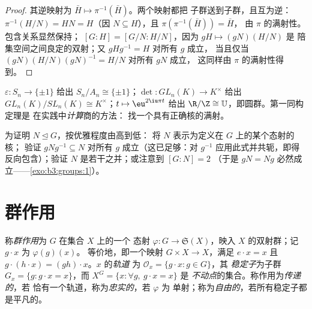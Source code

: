 \begin{proof}
其逆映射为 $\bar H \mapsto \pi^{-1}(\bar H)$。两个映射都把
子群送到子群，且互为逆：$\pi^{-1}(H/N) =
HN = H$（因 $N \subseteq H$），且 $\pi(\pi^{-1}(\bar H)) = \bar H$，
由 $\pi$ 的满射性。包含关系显然保持；
$[G:H] = [G/N : H/N]$，因为 $gH \mapsto (gN)(H/N)$ 是
陪集空间之间良定的双射；又 $gHg^{-1} = H$ 对所有 $g$ 成立，
当且仅当 $(gN)(H/N)(gN)^{-1} = H/N$ 对所有 $gN$ 成立，
这同样由 $\pi$ 的满射性得到。
\end{proof}

\begin{example}\label{ex:b3:groups:firstiso}
$\varepsilon \colon S_n \to \{\pm 1\}$ 给出 $S_n/A_n \cong
\{\pm1\}$；$\det \colon GL_n(K) \to K^\times$ 给出
$GL_n(K)/SL_n(K) \cong K^\times$；$t \mapsto \eu^{2\iu\pi t}$ 给出
$\R/\Z \cong \mathbb U$，即圆群。第一同构定理是
在实践中\emph{计算}商的方法：
找一个具有正确核的满射。
\end{example}

\begin{method}\label{met:b3:groups:normal}
为证明 $N \trianglelefteq G$，按优雅程度由高到低：
将 $N$ 表示为定义在 $G$ 上的某个态射的核；
验证 $gNg^{-1} \subseteq N$ 对所有 $g$ 成立（这已足够：对
$g^{-1}$ 应用此式并共轭，即得反向包含）；验证
$N$ 是若干之并；或注意到 $[G:N] = 2$
（于是 $gN = Ng$ 必然成立——\cref{exo:b3:groups:1}）。
\end{method}

\section{群作用}

\begin{definition}\label{def:b3:groups:action}
称\emph{群作用}为 $G$ 在集合 $X$ 上的一个
态射 $\varphi \colon G \to \mathfrak{S}(X)$，映入
$X$ 的双射群；记 $g \cdot x$ 为 $\varphi(g)(x)$。
等价地，即一个映射 $G \times X \to X$，满足 $e \cdot x = x$ 且 $g
\cdot (h \cdot x) = (gh) \cdot x$。$x$ 的\emph{轨道}
为 $\mathcal O_x = \{g \cdot x : g \in G\}$，其
\emph{稳定子}为子群 $G_x = \{g :
g\cdot x = x\}$，而 $X^G = \{x : \forall g,\ g \cdot x = x\}$ 是
\emph{不动点}的集合。称作用为\emph{传递的}，若
恰有一个轨道，称为\emph{忠实的}，若 $\varphi$ 为
单射；称为\emph{自由的}，若所有稳定子都是平凡的。
\end{definition}


